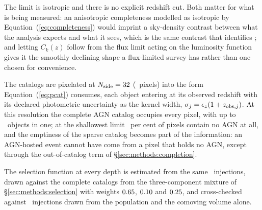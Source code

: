 The limit is isotropic and there is no explicit redshift cut. Both matter for
what is being measured: an anisotropic completeness modelled as isotropic by
Equation~(\ref{eq:completeness}) would imprint a sky-density contrast between
what the analysis expects and what it sees, which is the same contrast that
identifies \fagn; and letting $C_k(z)$ follow from the flux limit acting on the
luminosity function gives it the smoothly declining shape a flux-limited survey
has rather than one chosen for convenience.

The catalogs are pixelated at $N_{\rm side} = 32$
(\SurveyNpix\ pixels) into the form Equation~(\ref{eq:pcat}) consumes, each
object entering at its observed redshift with its declared photometric
uncertainty as the kernel width, $\sigma_j = \epsilon_z(1 + z_{{\rm obs},j})$. At
this resolution the complete AGN catalog occupies every pixel, with up to
\AgnPerPix\ objects in one; at the shallowest limit \AgnEmptyPixShallow\ per
cent of pixels contain no AGN at all, and the emptiness of the sparse catalog
becomes part of the information: an AGN-hosted event cannot have come from a
pixel that holds no AGN, except through the out-of-catalog term of
\S\ref{sec:methods:completion}.

The selection function at every depth is estimated from the same
\InjNdrawMain\ injections, drawn against the complete catalogs from the
three-component mixture of \S\ref{sec:methods:selection} with weights
$0.65$, $0.10$ and $0.25$, and cross-checked
against \InjNdrawCross\ injections drawn from the population and the comoving
volume alone.
